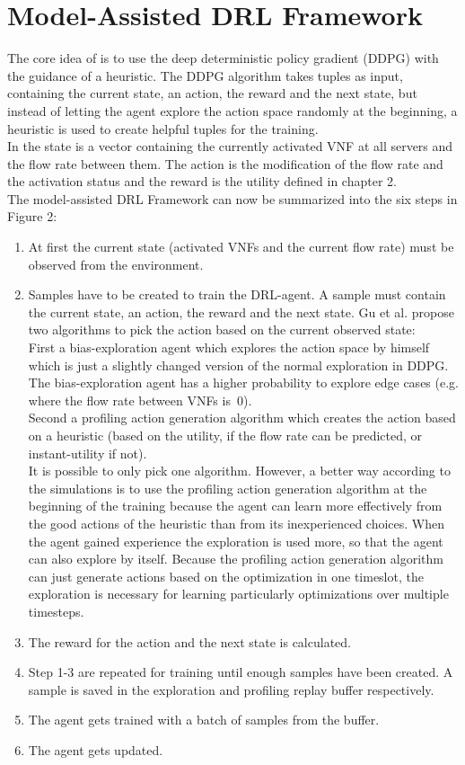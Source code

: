 \section{Model-Assisted DRL Framework}%
\label{sec:drl}
The core idea of \cite{Gu} is to use the deep deterministic policy gradient (DDPG) with the guidance of a heuristic. The DDPG algorithm takes tuples as input, containing the current state, an action, the reward and the next state, but instead of letting the agent explore the action space randomly at the beginning,  a heuristic is used to create helpful tuples for the training.\\
 In \cite{Gu} the state is a vector containing the currently activated VNF at all servers and the flow rate between them. The action is the modification of the flow rate and the activation status and the reward is the utility defined in chapter 2.\\
The model-assisted DRL Framework can now be summarized into the six steps in Figure 2:%
\begin{enumerate}
\item At first the current state (activated VNFs and the current flow rate) must be observed from the environment.
\item Samples have to be created to train the DRL-agent. A sample must contain the current state, an action, the reward and the next state. Gu et al. \cite {Gu} propose two algorithms to pick the action based on the current observed state: \\
First a bias-exploration agent which explores the action space by himself which is just a slightly changed version of the normal exploration in DDPG. The bias-exploration agent has a higher probability to explore edge cases (e.g. where the flow rate between VNFs is~0). \\
Second a profiling action generation algorithm which creates the action based on a heuristic (based on the utility, if the flow rate can be predicted, or instant-utility if not). \\
It is possible to only pick one algorithm. However, a better way according to the simulations is to use the profiling action generation algorithm at the beginning of the training because the agent can learn more effectively from the good actions of the heuristic than from its inexperienced choices. When the agent gained experience the exploration is used more, so that the agent can also explore by itself. Because the profiling action generation algorithm can just generate actions based on the optimization in one timeslot, the exploration is necessary for learning  particularly optimizations over multiple timesteps.
\item  The reward for the action and the next state is calculated.
\item Step 1-3 are repeated for training until enough samples have been created. A sample is saved in the exploration and profiling replay buffer respectively.
\item The agent gets trained with a batch of samples from the buffer.
\item The agent gets updated.
\end{enumerate}

